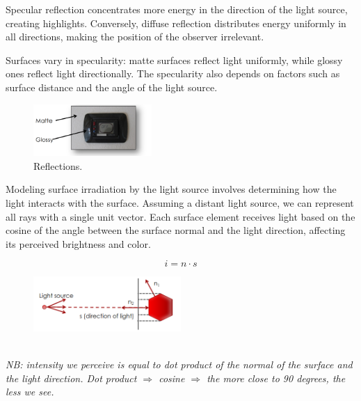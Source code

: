 Specular reflection concentrates more energy in the direction of the light source, creating highlights. 
Conversely, diffuse reflection distributes energy uniformly in all directions, making the position of the observer irrelevant. 

Surfaces vary in specularity: matte surfaces reflect light uniformly, while glossy ones reflect light directionally. 
The specularity also depends on factors such as surface distance and the angle of the light source.

\begin{figure}[H]
    \centering
    \includegraphics[width=0.4\textwidth]{Figures/matte.png}
    \caption{Reflections.} 
    \label{fig:matte}
\end{figure}

Modeling surface irradiation by the light source involves determining how the light interacts with the surface. 
Assuming a distant light source, we can represent all rays with a single unit vector. 
Each surface element receives light based on the cosine of the angle between the surface normal and the light direction, affecting its perceived brightness and color.

\[
  i = n\cdot s  
\]
\begin{figure}[h]
    \centering
    \includegraphics[width=0.5\textwidth]{Figures/Illumination.png}
\end{figure}
\\\textit{NB: intensity we perceive is equal to dot product of the normal of the surface and the light direction. Dot product $\Rightarrow$ cosine $\Rightarrow$ the more close to 90 degrees, the less we see.}
